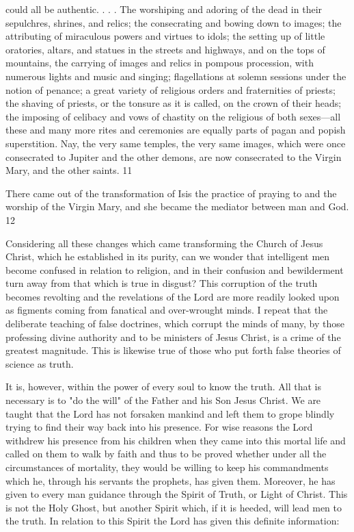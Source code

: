 could all be authentic. . . . The worshiping and adoring of the dead in their sepulchres,
shrines, and relics; the consecrating and bowing down to images; the attributing of
miraculous powers and virtues to idols; the setting up of little oratories, altars, and statues in
the streets and highways, and on the tops of mountains, the carrying of images and relics in
pompous procession, with numerous lights and music and singing; flagellations at solemn
sessions under the notion of penance; a great variety of religious orders and fraternities of
priests; the shaving of priests, or the tonsure as it is called, on the crown of their heads; the
imposing of celibacy and vows of chastity on the religious of both sexes—all these and many
more rites and ceremonies are equally parts of pagan and popish superstition. Nay, the very
same temples, the very same images, which were once consecrated to Jupiter and the other
demons, are now consecrated to the Virgin Mary, and the other saints. 11

There came out of the transformation of Isis the practice of praying to and the worship of the
Virgin Mary, and she became the mediator between man and God. 12

Considering all these changes which came transforming the Church of Jesus Christ, which he
established in its purity, can we wonder that intelligent men become confused in relation to
religion, and in their confusion and bewilderment turn away from that which is true in
disgust? This corruption of the truth becomes revolting and the revelations of the Lord are
more readily looked upon as figments coming from fanatical and over-wrought minds. I
repeat that the deliberate teaching of false doctrines, which corrupt the minds of many, by
those professing divine authority and to be ministers of Jesus Christ, is a crime of the greatest
magnitude. This is likewise true of those who put forth false theories of science as truth.

It is, however, within the power of every soul to know the truth. All that is necessary is to
"do the will" of the Father and his Son Jesus Christ. We are taught that the Lord has not
forsaken mankind and left them to grope blindly trying to find their way back into his
presence. For wise reasons the Lord withdrew his presence from his children when they came
into this mortal life and called on them to walk by faith and thus to be proved whether under
all the circumstances of mortality, they would be willing to keep his commandments which
he, through his servants the prophets, has given them. Moreover, he has given to every man
guidance through the Spirit of Truth, or Light of Christ. This is not the Holy Ghost, but
another Spirit which, if it is heeded, will lead men to the truth. In relation to this Spirit the
Lord has given this definite information:

